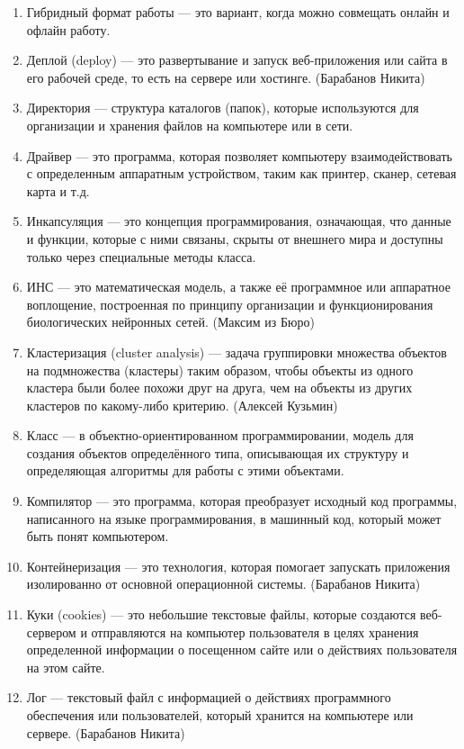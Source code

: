 \documentclass{article}
\begin{document}
\begin{enumerate}
    \item Гибридный формат работы --- это вариант, когда можно совмещать онлайн и офлайн работу.
    \item Деплой (deploy) --- это развертывание и запуск веб-приложения или сайта в его рабочей среде, то есть на сервере или хостинге. (Барабанов Никита)
    \item Директория  --- структура каталогов (папок), которые используются для организации и хранения файлов на компьютере или в сети.
    \item Драйвер  --- это программа, которая позволяет компьютеру взаимодействовать с определенным аппаратным устройством, таким как принтер, сканер, сетевая карта и т.д.
    \item Инкапсуляция --- это концепция программирования, означающая, что данные и функции, которые с ними связаны, скрыты от внешнего мира и доступны только через специальные методы класса.
    \item ИНС --- это  математическая модель, а также её программное или аппаратное воплощение, построенная по принципу организации и функционирования биологических нейронных сетей. (Максим из Бюро)
    \item Кластеризация (cluster analysis) --- задача группировки множества объектов на подмножества (кластеры) таким образом, чтобы объекты из одного кластера были более похожи друг на друга, чем на объекты из других кластеров по какому-либо критерию. (Алексей Кузьмин)
    \item Класс --- в объектно-ориентированном программировании, модель для создания объектов определённого типа, описывающая их структуру и определяющая алгоритмы для работы с этими объектами.
    \item Компилятор --- это программа, которая преобразует исходный код программы, написанного на языке программирования, в машинный код, который может быть понят компьютером.
    \item Контейнеризация --- это технология, которая помогает запускать приложения изолированно от основной операционной системы. (Барабанов Никита)
    \item Куки (cookies) --- это небольшие текстовые файлы, которые создаются веб-сервером и отправляются на компьютер пользователя в целях хранения определенной информации о посещенном сайте или о действиях пользователя на этом сайте.
    \item Лог --- текстовый файл с информацией о действиях программного обеспечения или пользователей, который хранится на компьютере или сервере. (Барабанов Никита)

\end{enumerate}
\end{document}
